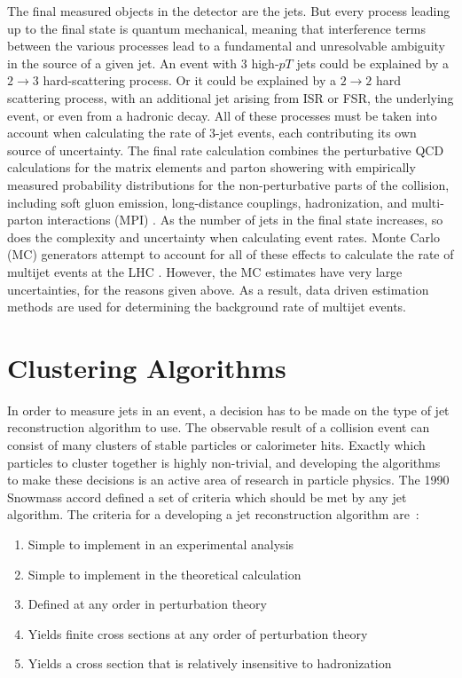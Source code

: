 The final measured objects in the detector are the jets.
But every process leading up to the final state is quantum mechanical,
meaning that interference terms between the various processes lead to a fundamental and unresolvable ambiguity in the source of a given jet.
An event with 3 high-$pT$ jets could be explained by a $2\rightarrow3$ hard-scattering process.
Or it could be explained by a $2\rightarrow2$ hard scattering process, with an additional jet arising from ISR or FSR, the underlying event, or even from a hadronic decay.
All of these processes must be taken into account when calculating the rate of 3-jet events, each contributing its own source of uncertainty.
The final rate calculation combines the perturbative QCD calculations for the matrix elements and parton showering with empirically measured probability distributions for the non-perturbative parts of the collision, including soft gluon emission, long-distance couplings, hadronization, and multi-parton interactions (MPI) .
As the number of jets in the final state increases, so does the complexity and uncertainty when calculating event rates.
Monte Carlo (MC) generators attempt to account for all of these effects to calculate the rate of multijet events at the LHC .
However, the MC estimates have very large uncertainties, for the reasons given above.
As a result, data driven estimation methods are used for determining the background rate of multijet events.

\section{Clustering Algorithms}\label{sec:jet_clustering}

In order to measure jets in an event, a decision has to be made on the type of jet reconstruction algorithm to use.
The observable result of a collision event can consist of many clusters of stable particles or calorimeter hits.
Exactly which particles to cluster together is highly non-trivial, and developing the algorithms to make these decisions is an active area of research in particle physics.
The 1990 Snowmass accord defined a set of criteria which should be met by any jet algorithm.
The criteria for a developing a jet reconstruction algorithm are~\cite{jet-jetography,jet-snowmass}:

\begin{enumerate}
    \item Simple to implement in an experimental analysis
    \item Simple to implement in the theoretical calculation
    \item Defined at any order in perturbation theory
    \item Yields finite cross sections at any order of perturbation theory
    \item Yields a cross section that is relatively insensitive to hadronization
\end{enumerate}


